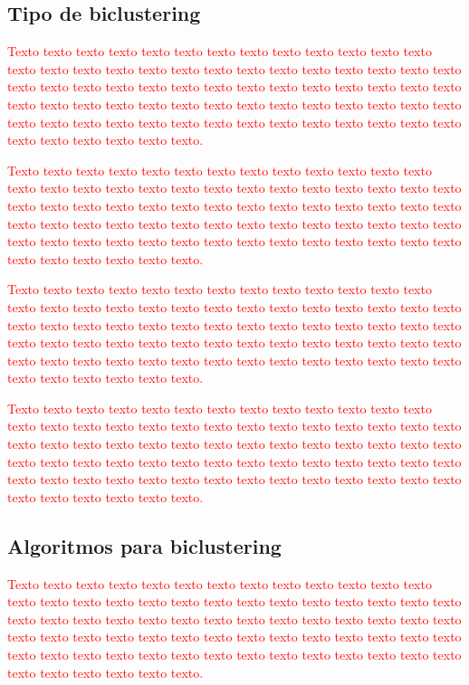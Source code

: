 \documentclass[normaltoc, espacoumemeio, pnumromarab,ruledheader]{abnt}
\begin{document}
   \subsection{Tipo de biclustering}
	
	\textcolor{red}{Texto texto texto texto texto texto texto texto texto texto texto texto texto texto texto texto texto texto texto texto texto texto texto texto texto texto texto texto texto texto texto texto texto texto texto texto texto texto texto texto texto texto texto texto texto texto texto texto texto texto texto texto texto texto texto texto texto texto texto texto texto texto texto texto texto texto texto texto texto texto texto texto texto texto texto.}
	
	\textcolor{red}{Texto texto texto texto texto texto texto texto texto texto texto texto texto texto texto texto texto texto texto texto texto texto texto texto texto texto texto texto texto texto texto texto texto texto texto texto texto texto texto texto texto texto texto texto texto texto texto texto texto texto texto texto texto texto texto texto texto texto texto texto texto texto texto texto texto texto texto texto texto texto texto texto texto texto texto.}
	
	\textcolor{red}{Texto texto texto texto texto texto texto texto texto texto texto texto texto texto texto texto texto texto texto texto texto texto texto texto texto texto texto texto texto texto texto texto texto texto texto texto texto texto texto texto texto texto texto texto texto texto texto texto texto texto texto texto texto texto texto texto texto texto texto texto texto texto texto texto texto texto texto texto texto texto texto texto texto texto texto.}
	
	\textcolor{red}{Texto texto texto texto texto texto texto texto texto texto texto texto texto texto texto texto texto texto texto texto texto texto texto texto texto texto texto texto texto texto texto texto texto texto texto texto texto texto texto texto texto texto texto texto texto texto texto texto texto texto texto texto texto texto texto texto texto texto texto texto texto texto texto texto texto texto texto texto texto texto texto texto texto texto texto.}
	
	 \subsection{Algoritmos para biclustering}
	
	\textcolor{red}{Texto texto texto texto texto texto texto texto texto texto texto texto texto texto texto texto texto texto texto texto texto texto texto texto texto texto texto texto texto texto texto texto texto texto texto texto texto texto texto texto texto texto texto texto texto texto texto texto texto texto texto texto texto texto texto texto texto texto texto texto texto texto texto texto texto texto texto texto texto texto texto texto texto texto texto.}
	
\end{document}
